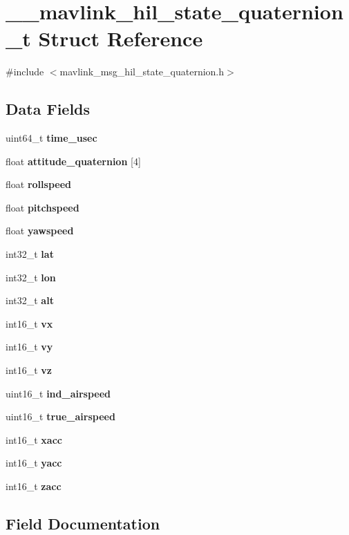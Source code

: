 \section{\+\_\+\+\_\+mavlink\+\_\+hil\+\_\+state\+\_\+quaternion\+\_\+t Struct Reference}
\label{struct____mavlink__hil__state__quaternion__t}


{\ttfamily \#include $<$mavlink\+\_\+msg\+\_\+hil\+\_\+state\+\_\+quaternion.\+h$>$}

\subsection*{Data Fields}
\begin{DoxyCompactItemize}
\item 
uint64\+\_\+t \textbf{ time\+\_\+usec}
\item 
float \textbf{ attitude\+\_\+quaternion} [4]
\item 
float \textbf{ rollspeed}
\item 
float \textbf{ pitchspeed}
\item 
float \textbf{ yawspeed}
\item 
int32\+\_\+t \textbf{ lat}
\item 
int32\+\_\+t \textbf{ lon}
\item 
int32\+\_\+t \textbf{ alt}
\item 
int16\+\_\+t \textbf{ vx}
\item 
int16\+\_\+t \textbf{ vy}
\item 
int16\+\_\+t \textbf{ vz}
\item 
uint16\+\_\+t \textbf{ ind\+\_\+airspeed}
\item 
uint16\+\_\+t \textbf{ true\+\_\+airspeed}
\item 
int16\+\_\+t \textbf{ xacc}
\item 
int16\+\_\+t \textbf{ yacc}
\item 
int16\+\_\+t \textbf{ zacc}
\end{DoxyCompactItemize}


\subsection{Field Documentation}
\mbox{\label{struct____mavlink__hil__state__quaternion__t_a677cbc2ca7dc4e9f0516bd42110f0062}} 
